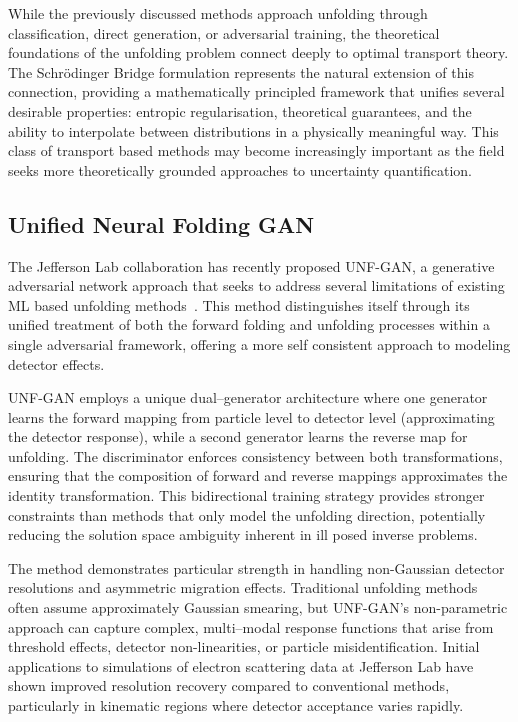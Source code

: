     While the previously discussed methods approach unfolding through classification, direct generation, or adversarial training, the theoretical foundations of the unfolding problem connect deeply to optimal transport theory.
    The Schr\"odinger Bridge formulation represents the natural extension of this connection, providing a mathematically principled framework that unifies several desirable properties: entropic regularisation, theoretical guarantees, and the ability to interpolate between distributions in a physically meaningful way.
    This class of transport based methods may become increasingly important as the field seeks more theoretically grounded approaches to uncertainty quantification.

\subsection{Unified Neural Folding GAN}
    The Jefferson Lab collaboration has recently proposed UNF-GAN, a generative adversarial network approach that seeks to address several limitations of existing ML based unfolding methods~\cite{Alghamdi:2023emm}.
    This method distinguishes itself through its unified treatment of both the forward folding and unfolding processes within a single adversarial framework, offering a more self consistent approach to modeling detector effects.
    
    UNF-GAN employs a unique dual--generator architecture where one generator learns the forward mapping from particle level to detector level (approximating the detector response), while a second generator learns the reverse map for unfolding.
    The discriminator enforces consistency between both transformations, ensuring that the composition of forward and reverse mappings approximates the identity transformation.
    This bidirectional training strategy provides stronger constraints than methods that only model the unfolding direction, potentially reducing the solution space ambiguity inherent in ill posed inverse problems.

    The method demonstrates particular strength in handling non-Gaussian detector resolutions and asymmetric migration effects.
    Traditional unfolding methods often assume approximately Gaussian smearing, but UNF-GAN's non-parametric approach can capture complex, multi--modal response functions that arise from threshold effects, detector non-linearities, or particle misidentification.
    Initial applications to simulations of electron scattering data at Jefferson Lab have shown improved resolution recovery compared to conventional methods, particularly in kinematic regions where detector acceptance varies rapidly.
    
